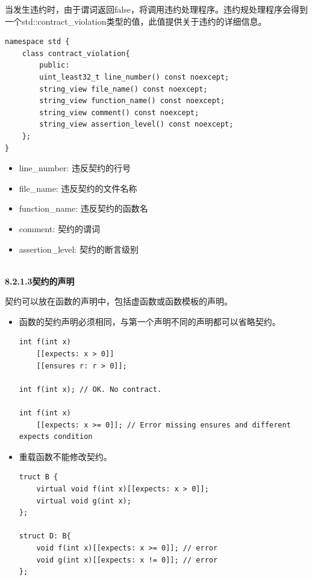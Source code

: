 当发生违约时，由于谓词返回false，将调用违约处理程序。违约规处理程序会得到一个std::contract\_violation类型的值，此值提供关于违约的详细信息。

\begin{lstlisting}[style=styleCXX]
namespace std {
	class contract_violation{
		public:
		uint_least32_t line_number() const noexcept;
		string_view file_name() const noexcept;
		string_view function_name() const noexcept;
		string_view comment() const noexcept;
		string_view assertion_level() const noexcept;
	};
}
\end{lstlisting}

\begin{itemize}
\item 
line\_number: 违反契约的行号

\item 
file\_name: 违反契约的文件名称

\item 
function\_name: 违反契约的函数名

\item 
comment: 契约的谓词

\item 
assertion\_level: 契约的断言级别
\end{itemize}

\hspace*{\fill} \\ %
\noindent
\textbf{8.2.1.3\hspace{0.2cm}契约的声明}

契约可以放在函数的声明中，包括虚函数或函数模板的声明。

\begin{itemize}
\item 
函数的契约声明必须相同，与第一个声明不同的声明都可以省略契约。

\begin{lstlisting}[style=styleCXX]
int f(int x)
	[[expects: x > 0]]
	[[ensures r: r > 0]];

int f(int x); // OK. No contract.

int f(int x)
	[[expects: x >= 0]]; // Error missing ensures and different expects condition
\end{lstlisting}

\item 
重载函数不能修改契约。

\begin{lstlisting}[style=styleCXX]
truct B {
	virtual void f(int x)[[expects: x > 0]];
	virtual void g(int x);
};

struct D: B{
	void f(int x)[[expects: x >= 0]]; // error
	void g(int x)[[expects: x != 0]]; // error
};
\end{lstlisting}
\end{itemize}

